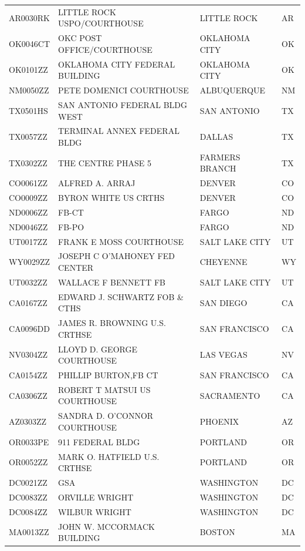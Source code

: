 \documentclass[12pt]{article}
\begin{document}
\begin{longtable}{llll}
AR0030RK         & LITTLE ROCK USPO/COURTHOUSE     & LITTLE ROCK    & AR    \\
OK0046CT         & OKC POST OFFICE/COURTHOUSE      & OKLAHOMA CITY  & OK    \\
OK0101ZZ         & OKLAHOMA CITY FEDERAL BUILDING  & OKLAHOMA CITY  & OK    \\
NM0050ZZ         & PETE DOMENICI COURTHOUSE        & ALBUQUERQUE    & NM    \\
TX0501HS         & SAN ANTONIO FEDERAL BLDG WEST   & SAN ANTONIO    & TX    \\
TX0057ZZ         & TERMINAL ANNEX FEDERAL BLDG     & DALLAS         & TX    \\
TX0302ZZ         & THE CENTRE PHASE 5              & FARMERS BRANCH & TX    \\
CO0061ZZ         & ALFRED A. ARRAJ                 & DENVER         & CO    \\
CO0009ZZ         & BYRON WHITE US CRTHS            & DENVER         & CO    \\
ND0006ZZ         & FB-CT                           & FARGO          & ND    \\
ND0046ZZ         & FB-PO                           & FARGO          & ND    \\
UT0017ZZ         & FRANK E MOSS COURTHOUSE         & SALT LAKE CITY & UT    \\
WY0029ZZ         & JOSEPH C O'MAHONEY FED CENTER   & CHEYENNE       & WY    \\
UT0032ZZ         & WALLACE F BENNETT FB            & SALT LAKE CITY & UT    \\
CA0167ZZ         & EDWARD J. SCHWARTZ FOB \& CTHS  & SAN DIEGO      & CA    \\
CA0096DD         & JAMES R. BROWNING U.S. CRTHSE   & SAN FRANCISCO  & CA    \\
NV0304ZZ         & LLOYD D. GEORGE COURTHOUSE      & LAS VEGAS      & NV    \\
CA0154ZZ         & PHILLIP BURTON,FB CT            & SAN FRANCISCO  & CA    \\
CA0306ZZ         & ROBERT T MATSUI US COURTHOUSE   & SACRAMENTO     & CA    \\
AZ0303ZZ         & SANDRA D. O'CONNOR COURTHOUSE   & PHOENIX        & AZ    \\
OR0033PE         & 911 FEDERAL BLDG                & PORTLAND       & OR    \\
OR0052ZZ         & MARK O. HATFIELD U.S. CRTHSE    & PORTLAND       & OR    \\
DC0021ZZ         & GSA                             & WASHINGTON     & DC    \\
DC0083ZZ         & ORVILLE WRIGHT                  & WASHINGTON     & DC    \\
DC0084ZZ         & WILBUR WRIGHT                   & WASHINGTON     & DC    \\
MA0013ZZ         & JOHN W. MCCORMACK BUILDING      & BOSTON         & MA   \\
\hline
\end{longtable}
\FloatBarrier
\end{document}
